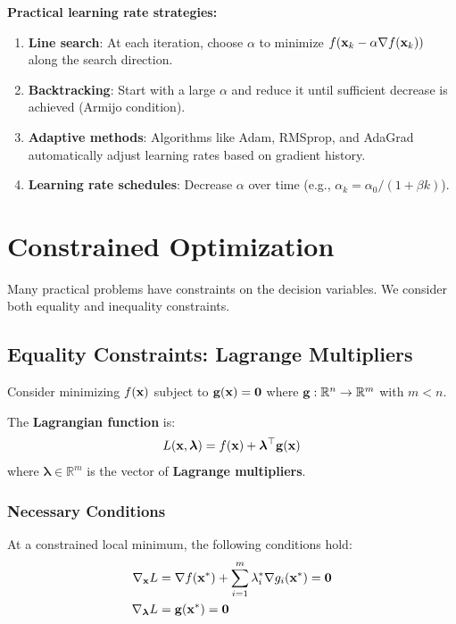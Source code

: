 \textbf{Practical learning rate strategies:}
\begin{enumerate}
    \item \textbf{Line search}: At each iteration, choose $\alpha$ to minimize $f(\mathbf{x}_k - \alpha \nabla f(\mathbf{x}_k))$ along the search direction.
    \item \textbf{Backtracking}: Start with a large $\alpha$ and reduce it until sufficient decrease is achieved (Armijo condition).
    \item \textbf{Adaptive methods}: Algorithms like Adam, RMSprop, and AdaGrad automatically adjust learning rates based on gradient history.
    \item \textbf{Learning rate schedules}: Decrease $\alpha$ over time (e.g., $\alpha_k = \alpha_0 / (1 + \beta k)$).
\end{enumerate}

\section{Constrained Optimization}

Many practical problems have constraints on the decision variables. We consider both equality and inequality constraints.

\subsection{Equality Constraints: Lagrange Multipliers}

Consider minimizing $f(\mathbf{x})$ subject to $\mathbf{g}(\mathbf{x}) = \mathbf{0}$ where $\mathbf{g}: \mathbb{R}^n \to \mathbb{R}^m$ with $m < n$.

The \textbf{Lagrangian function} is:
\begin{equation}
L(\mathbf{x}, \boldsymbol{\lambda}) = f(\mathbf{x}) + \boldsymbol{\lambda}^\top \mathbf{g}(\mathbf{x})
\end{equation}
where $\boldsymbol{\lambda} \in \mathbb{R}^m$ is the vector of \textbf{Lagrange multipliers}.

\subsubsection{Necessary Conditions}
At a constrained local minimum, the following conditions hold:
\begin{align}
\nabla_{\mathbf{x}} L &= \nabla f(\mathbf{x}^*) + \sum_{i=1}^{m} \lambda_i^* \nabla g_i(\mathbf{x}^*) = \mathbf{0} \\
\nabla_{\boldsymbol{\lambda}} L &= \mathbf{g}(\mathbf{x}^*) = \mathbf{0}
\end{align}

